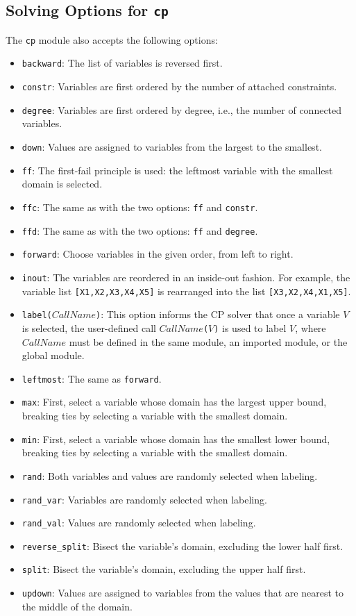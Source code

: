 \subsection{Solving Options for \texttt{cp}}
The \texttt{cp} module also accepts the following options:
\begin{itemize}
\item \texttt{backward}: The list of variables is reversed first.
\item \texttt{constr}: Variables are first ordered by the number of attached constraints.
\item \texttt{degree}: Variables are first ordered by degree, i.e., the number of connected variables.
\item \texttt{down}: Values are assigned to variables from the largest to the smallest.
\item \texttt{ff}: The first-fail principle is used: the leftmost variable with the smallest domain is selected.
\item \texttt{ffc}: The same as with the two options: \texttt{ff} and \texttt{constr}.
\item \texttt{ffd}: The same as with the two options: \texttt{ff} and \texttt{degree}.
\item \texttt{forward}: Choose variables in the given order, from left to right.
\item \texttt{inout}: The variables are reordered in an inside-out fashion. For example, the variable list \texttt{[X1,X2,X3,X4,X5]} is rearranged into the list \texttt{[X3,X2,X4,X1,X5]}.
\item \texttt{label($CallName$)}: This option informs the CP solver that once a variable $V$ is selected, the user-defined call \texttt{$CallName$($V$)} is used to label $V$, where $CallName$ must be defined in the same module, an imported module, or the global module.
\item \texttt{leftmost}: The same as \texttt{forward}.
\item \texttt{max}: First, select a variable whose domain has the largest upper bound, breaking ties by selecting a variable with the smallest domain.
\item \texttt{min}: First, select a variable whose domain has the smallest lower bound, breaking ties by selecting a variable with the smallest domain.
\item \texttt{rand}: Both variables and values are randomly selected when labeling.
\item \texttt{rand\_var}: Variables are randomly selected when labeling.
\item \texttt{rand\_val}: Values are randomly selected when labeling.
\item \texttt{reverse\_split}: Bisect the variable's domain, excluding the lower half first.
\item \texttt{split}: Bisect the variable's domain, excluding the upper half first.
\item \texttt{updown}: Values are assigned to variables from the values that are nearest to the middle of the domain.
\end{itemize}

